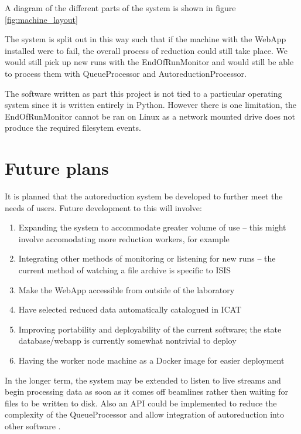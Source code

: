 \documentclass[twocolumn]{article}
\begin{document}
A diagram of the different parts of the system is shown in figure \ref{fig:machine_layout}

The system is split out in this way such that if the machine with the WebApp installed were to fail,
the overall process of reduction could still take place. We would still pick up new runs with the 
EndOfRunMonitor and would still be able to process them with QueueProcessor and AutoreductionProcessor.

The software written as part this project is not tied to a particular operating system since 
it is written entirely in Python. However there is one limitation, the EndOfRunMonitor
cannot be ran on Linux as a network mounted drive does not produce the required filesytem events.

\section{Future plans}\label{future-plans}

It is planned that the autoreduction system be developed to further meet
the needs of users. Future development to this will involve:

\begin{enumerate}
\item
  Expanding the system to accommodate greater volume of use -- this
  might involve accomodating more reduction workers, for example
\item
  Integrating other methods of monitoring or listening for new runs -- the current
  method of watching a file archive is specific to ISIS
\item
  Make the WebApp accessible from outside of the laboratory
\item
  Have selected reduced data automatically catalogued in ICAT 
\item
  Improving portability and deployability of the current software; the
  state database/webapp is currently somewhat nontrivial to deploy
\item 
  Having the worker node machine as a Docker \cite{docker} image for
  easier deployment

\end{enumerate}

In the longer term, the system may be extended to listen to live streams and begin
processing data as soon as it comes off beamlines rather then waiting for files 
to be written to disk. Also an API could be implemented to reduce the complexity of
the QueueProcessor and allow integration of autoreduction into other software \cite{autoreduction-api}. 
\end{document}

